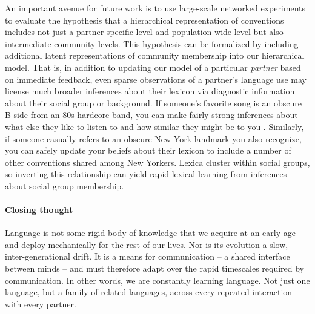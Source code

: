 An important avenue for future work is to use large-scale networked experiments to evaluate the hypothesis that a hierarchical representation of conventions includes not just a partner-specific level and population-wide level but also intermediate community levels. 
This hypothesis can be formalized by including additional latent representations of community membership into our hierarchical model.
That is, in addition to updating our model of a particular \emph{partner} based on immediate feedback, even sparse observations of a partner's language use may license much broader inferences about their lexicon via diagnostic information about their social group or background. 
If someone's favorite song is an obscure B-side from an 80s hardcore band, you can make fairly strong inferences about what else they like to listen to and how similar they might be to you \cite{VelezEtAl16_Overlaps, GershmanEtAl17_StructureSocialInfluence}. 
Similarly, if someone casually refers to an obscure New York landmark you also recognize, you can safely update your beliefs about their lexicon to include a number of other conventions shared among New Yorkers. 
Lexica cluster within social groups, so inverting this relationship can yield rapid lexical learning from inferences about social group membership.

\paragraph{Closing thought}

Language is not some rigid body of knowledge that we acquire at an early age and deploy mechanically for the rest of our lives. 
Nor is its evolution a slow, inter-generational drift. 
It is a means for communication -- a shared interface between minds -- and must therefore adapt over the rapid timescales required by communication. 
In other words, we are constantly learning language. 
Not just one language, but a family of related languages, across every repeated interaction with every partner. 


